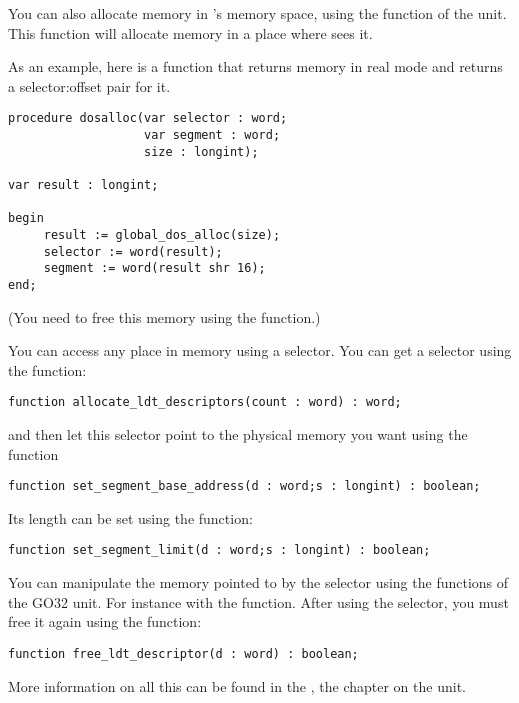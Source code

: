 You can also allocate memory in \dos's memory space, using the
 function of the  unit.
This function will allocate memory in a place where \dos sees it.

As an example, here is a function that returns memory in real mode \dos and
returns a selector:offset pair for it.
\begin{verbatim}
procedure dosalloc(var selector : word;
                   var segment : word;
                   size : longint);

var result : longint;

begin
     result := global_dos_alloc(size);
     selector := word(result);
     segment := word(result shr 16);
end;
\end{verbatim}
(You need to free this memory using the  function.)

You can access any place in memory using a selector. You can get a selector
using the function:
\begin{verbatim}
function allocate_ldt_descriptors(count : word) : word;
\end{verbatim} 
and then let this selector point to the physical memory you want using the
function
\begin{verbatim}
function set_segment_base_address(d : word;s : longint) : boolean;
\end{verbatim}
Its length can be set using the function:
\begin{verbatim}
function set_segment_limit(d : word;s : longint) : boolean;
\end{verbatim}
You can manipulate the memory pointed to by the selector using the functions
of the GO32 unit. For instance with the  function.
After using the selector, you must free it again using the function:
\begin{verbatim}
function free_ldt_descriptor(d : word) : boolean;
\end{verbatim}

More information on all this can be found in the \unitsref, the chapter on
the  unit.

